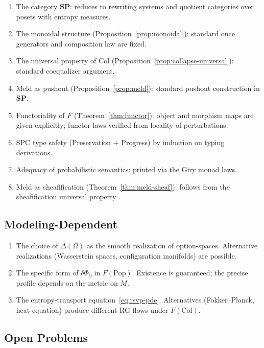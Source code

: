 \documentclass[12pt, a4paper]{article}
\theoremstyle{definition}
\theoremstyle{remark}
\newcommand{\SP}{\mathbf{SP}}
\newcommand{\Pop}{\mathrm{Pop}}
\newcommand{\Collapse}{\mathrm{Col}}
\begin{document}
\begin{enumerate}
  \item The category $\SP$: reduces to rewriting systems and quotient categories over
    posets with entropy measures.
  \item The monoidal structure (Proposition~\ref{prop:monoidal}): standard once generators
    and composition law are fixed.
  \item The universal property of $\Collapse$ (Proposition~\ref{prop:collapse-universal}):
    standard coequalizer argument.
  \item Meld as pushout (Proposition~\ref{prop:meld}): standard pushout construction
    in $\SP$.
  \item Functoriality of $F$ (Theorem~\ref{thm:functor}): object and morphism maps are
    given explicitly; functor laws verified from locality of perturbations.
  \item SPC type safety (Preservation + Progress)
    by induction on typing derivations.
  \item Adequacy of probabilistic semantics: printed via
    the Giry monad laws.
  \item Meld as sheafification (Theorem~\ref{thm:meld-sheaf}): follows from the
    sheafification universal property \citep{maclane1992}.
\end{enumerate}

\subsection{Modeling-Dependent}

\begin{enumerate}
  \item The choice of $\Delta(\Omega)$ as the smooth realization of option-spaces.
    Alternative realizations (Wasserstein spaces, configuration manifolds) are possible.
  \item The specific form of $\delta\Phi_\partial$ in $F(\Pop)$. Existence is guaranteed;
    the precise profile depends on the metric on $M$.
  \item The entropy-transport equation~\eqref{eq:rsvp-pde}. Alternatives (Fokker--Planck,
    heat equation) produce different RG flows under $F(\Collapse)$.
\end{enumerate}

\subsection{Open Problems}
\end{document}
